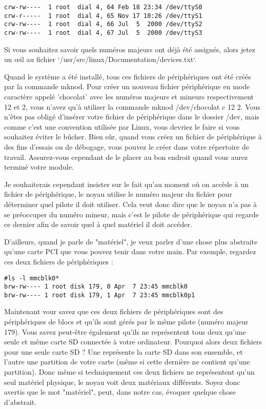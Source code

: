\documentclass[11pt]{article}
\begin{document}
\begin{itemize}
\begin{verbatim}
crw-rw----  1 root  dial 4, 64 Feb 18 23:34 /dev/ttyS0
crw-r-----  1 root  dial 4, 65 Nov 17 10:26 /dev/ttyS1
crw-rw----  1 root  dial 4, 66 Jul  5  2000 /dev/ttyS2
crw-rw----  1 root  dial 4, 67 Jul  5  2000 /dev/ttyS3
\end{verbatim}

Si vous souhaitez savoir quels numéros majeurs ont déjà été assignés, alors jetez un œil au fichier `/usr/src/linux/Documentation/devices.txt`.

Quand le système a été installé, tous ces fichiers de périphériques ont été créés par la commande mknod. Pour créer un nouveau fichier périphérique en mode caractère appelé 'chocolat' avec les numéros majeurs et mineurs respectivement 12 et 2, vous n'avez qu'à utiliser la commande mknod /dev/chocolat c 12 2. Vous n'êtes pas obligé d'insérer votre fichier de périphérique dans le dossier /dev, mais comme c'est une convention utilisée par Linux, vous devriez le faire si vous souhaitez éviter le bûcher. Bien sûr, quand vous créez un fichier de périphérique à des fins d'essais ou de débogage, vous pouvez le créer dans votre répertoire de travail. Assurez-vous cependant de le placer au bon endroit quand vous aurez terminé votre module.

Je souhaiterais cependant insister sur le fait qu'au moment où on accède à un fichier de périphérique, le noyau utilise le numéro majeur du fichier pour déterminer quel pilote il doit utiliser. Cela veut donc dire que le noyau n'a pas à se préoccuper du numéro mineur, mais c'est le pilote de périphérique qui regarde ce dernier afin de savoir quel à quel matériel il doit accéder.

D'ailleurs, quand je parle de "matériel", je veux parler d'une chose plus abstraite qu'une carte PCI que vous pouvez tenir dans votre main. Par exemple, regardez ces deux fichiers de périphériques :

\begin{verbatim}
#ls -l mmcblk0*
brw-rw---- 1 root disk 179, 0 Apr  7 23:45 mmcblk0
brw-rw---- 1 root disk 179, 1 Apr  7 23:45 mmcblk0p1
\end{verbatim}

Maintenant vour savez que ces deux fichiers de périphériques sont des périphériques de blocs et qu'ils sont gérés par le même pilote (numéro majeur 179). Vous savez peut-être également qu'ils ne représentent tous deux qu'une seule et même carte SD connectée à votre ordinateur. Pourquoi alors deux fichiers pour une seule carte SD ? Une représente la carte SD dans son ensemble, et l'autre une partition de votre carte (même si cette dernière ne contient qu'une partition). Donc même si techniquement ces deux fichiers ne représentent qu'un seul matériel physique, le noyau voit deux matériaux différents. Soyez donc avertis que le mot "matériel", peut, dans notre cas, évoquer quelque chose d'abstrait.
\end{itemize}
\end{document}
